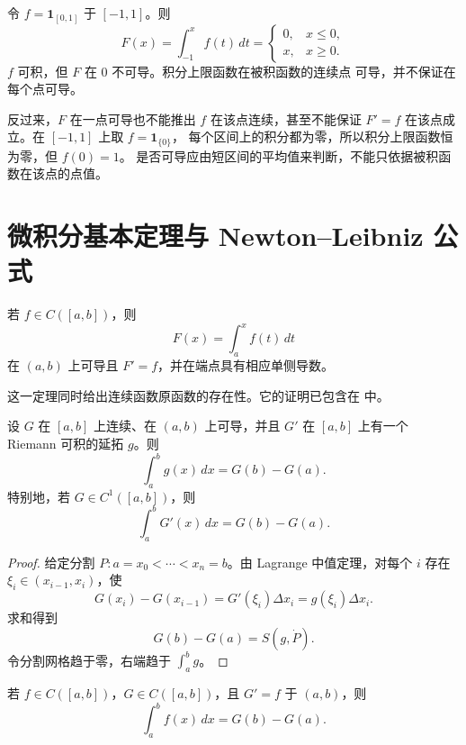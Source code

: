 \begin{counterexample}
令 \(f=\mathbf1_{[0,1]}\) 于 \([-1,1]\)。则
\[
 F(x)=\int_{-1}^x f(t)\,dt
 =
 \begin{cases}
 0,&x\le0,\\
 x,&x\ge0.
 \end{cases}
\]
\(f\) 可积，但 \(F\) 在 \(0\) 不可导。积分上限函数在被积函数的连续点
可导，并不保证在每个点可导。
\end{counterexample}

反过来，\(F\) 在一点可导也不能推出 \(f\) 在该点连续，甚至不能保证
\(F'=f\) 在该点成立。在 \([-1,1]\) 上取 \(f=\mathbf1_{\{0\}}\)，
每个区间上的积分都为零，所以积分上限函数恒为零，但 \(f(0)=1\)。
是否可导应由短区间的平均值来判断，不能只依据被积函数在该点的点值。

\section{微积分基本定理与 Newton--Leibniz 公式}

\begin{theorem}[微积分基本定理第一部分]
\label{thm:ftc-first}
若 \(f\in C([a,b])\)，则
\[
 F(x)=\int_a^x f(t)\,dt
\]
在 \((a,b)\) 上可导且 \(F'=f\)，并在端点具有相应单侧导数。
\end{theorem}

这一定理同时给出连续函数原函数的存在性。它的证明已包含在
 中。

\begin{theorem}
\label{thm:newton-leibniz}
设 \(G\) 在 \([a,b]\) 上连续、在 \((a,b)\) 上可导，并且
\(G'\) 在 \([a,b]\) 上有一个 Riemann 可积的延拓 \(g\)。则
\[
 \int_a^b g(x)\,dx=G(b)-G(a).
\]
特别地，若 \(G\in C^1([a,b])\)，则
\[
 \int_a^b G'(x)\,dx=G(b)-G(a).
\]
\end{theorem}

\begin{proof}
给定分割 \(P:a=x_0<\cdots<x_n=b\)。由 Lagrange 中值定理，对每个
\(i\) 存在 \(\xi_i\in(x_{i-1},x_i)\)，使
\[
 G(x_i)-G(x_{i-1})=G'(\xi_i)\Delta x_i
 =g(\xi_i)\Delta x_i.
\]
求和得到
\[
 G(b)-G(a)=S(g,\dot P).
\]
令分割网格趋于零，右端趋于 \(\int_a^b g\)。
\end{proof}

\begin{corollary}[微积分基本定理第二部分]
若 \(f\in C([a,b])\)，\(G\in C([a,b])\)，且 \(G'=f\) 于
\((a,b)\)，则
\[
 \int_a^b f(x)\,dx=G(b)-G(a).
\]
\end{corollary}

